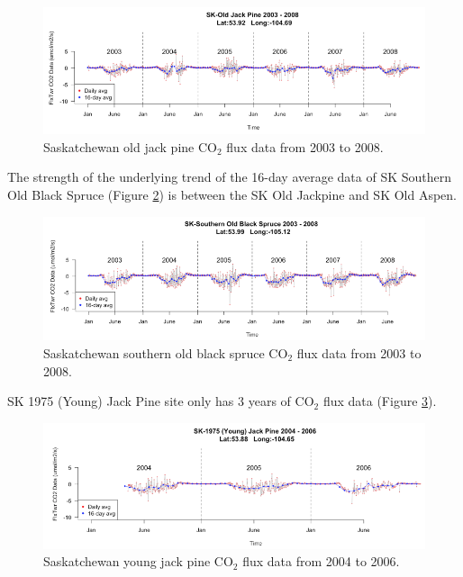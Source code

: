 \documentclass{article}
\begin{document}
\begin{figure}[!ht]
\centering
\includegraphics[width=14cm]{OJPmodis1.png}
\caption{Saskatchewan old jack pine CO$_2$ flux data from 2003 to 2008.}
\label{Fig:OJPmodis}
\end{figure}

The strength of the underlying trend of the 16-day average data of SK Southern Old Black Spruce (Figure \ref{Fig:SOUmodis}) is between the SK Old Jackpine and SK Old Aspen.

\begin{figure}[!ht]
\centering
\includegraphics[width=14cm]{SOUmodis1.png}
\caption{Saskatchewan southern old black spruce CO$_2$ flux data from 2003 to 2008.}
\label{Fig:SOUmodis}
\end{figure}

SK 1975 (Young) Jack Pine site only has 3 years of CO$_2$ flux data (Figure \ref{Fig:YJPmodis}).

\begin{figure}[!ht]
\centering
\includegraphics[width=14cm]{YJPmodis1.png}
\caption{Saskatchewan young jack pine CO$_2$ flux data from 2004 to 2006.}
\label{Fig:YJPmodis}
\end{figure}
\end{document}
